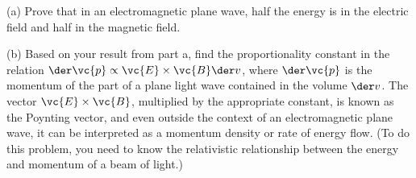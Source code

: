         (a) Prove that in an electromagnetic plane wave, half the energy
        is in the electric field and half in the magnetic field.\hwendpart

(b) Based on your result from part a, find the proportionality
constant in the relation $\der\vc{p}\propto\vc{E}\times\vc{B}\der v$,
where $\der \vc{p}$ is the momentum of the part of a plane light wave
contained in the volume $\der v$. The vector $\vc{E}\times\vc{B}$,
multiplied by the appropriate constant, is known as the Poynting
vector, and even outside the context of an electromagnetic plane wave,
it can be interpreted as a momentum density or rate of
energy flow. (To do this problem, you need to know the relativistic
relationship between the energy and momentum of a beam of
light.)\answercheck

